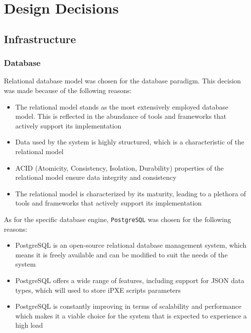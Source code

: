\documentclass[../main.tex]{subfiles}
\begin{document}
\section{Design Decisions}

\subsection{Infrastructure}

\subsubsection{Database}
Relational database model was chosen for the database paradigm. This decision was made because of the following reasons:

\begin{itemize}
  \item The relational model stands as the most extensively employed database model. This is reflected in the abundance of tools and frameworks that actively support its implementation
  \item Data used by the system is highly structured, which is a characteristic of the relational model
  \item ACID (Atomicity, Consistency, Isolation, Durability) properties of the relational model ensure data integrity and consistency
  \item The relational model is characterized by its maturity, leading to a plethora of tools and frameworks that actively support its implementation
\end{itemize}

As for the specific database engine, \texttt{PostgreSQL} \cite{postgresql} was chosen for the following reasons:

\begin{itemize}
  \item PostgreSQL is an open-source relational database management system, which means it is freely available and can be modified to suit the needs of the system
  \item PostgreSQL offers a wide range of features, including support for JSON data types, which will used to store iPXE scripts parameters
  \item PostgreSQL is constantly improving in terms of scalability and performance which makes it a viable choice for the system that is expected to experience a high load
\end{itemize}
\end{document}
